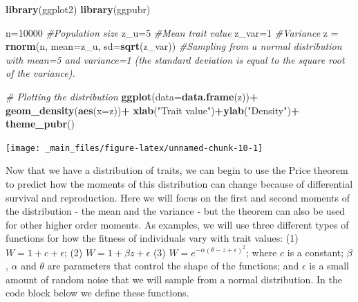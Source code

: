 \documentclass[
]{book}
\newenvironment{Shaded}{\begin{snugshade}}{\end{snugshade}}
\newcommand{\AttributeTok}[1]{\textcolor[rgb]{0.13,0.29,0.53}{#1}}
\newcommand{\CommentTok}[1]{\textcolor[rgb]{0.56,0.35,0.01}{\textit{#1}}}
\newcommand{\DecValTok}[1]{\textcolor[rgb]{0.00,0.00,0.81}{#1}}
\newcommand{\FunctionTok}[1]{\textcolor[rgb]{0.13,0.29,0.53}{\textbf{#1}}}
\newcommand{\NormalTok}[1]{#1}
\newcommand{\OtherTok}[1]{\textcolor[rgb]{0.56,0.35,0.01}{#1}}
\newcommand{\SpecialCharTok}[1]{\textcolor[rgb]{0.81,0.36,0.00}{\textbf{#1}}}
\newcommand{\StringTok}[1]{\textcolor[rgb]{0.31,0.60,0.02}{#1}}
\begin{document}
\begin{Shaded}
\begin{Highlighting}[]
\FunctionTok{library}\NormalTok{(ggplot2)}
\FunctionTok{library}\NormalTok{(ggpubr)}

\NormalTok{n}\OtherTok{=}\DecValTok{10000} \CommentTok{\#Population size}
\NormalTok{z\_u}\OtherTok{=}\DecValTok{5} \CommentTok{\#Mean trait value}
\NormalTok{z\_var}\OtherTok{=}\DecValTok{1} \CommentTok{\#Variance}
\NormalTok{z }\OtherTok{=} \FunctionTok{rnorm}\NormalTok{(n, }\AttributeTok{mean=}\NormalTok{z\_u, }\AttributeTok{sd=}\FunctionTok{sqrt}\NormalTok{(z\_var)) }\CommentTok{\#Sampling from a normal distribution with mean=5 and variance=1 (the standard deviation is equal to the square root of the variance).}

\CommentTok{\# Plotting the distribution}
\FunctionTok{ggplot}\NormalTok{(}\AttributeTok{data=}\FunctionTok{data.frame}\NormalTok{(z))}\SpecialCharTok{+}
  \FunctionTok{geom\_density}\NormalTok{(}\FunctionTok{aes}\NormalTok{(}\AttributeTok{x=}\NormalTok{z))}\SpecialCharTok{+}
  \FunctionTok{xlab}\NormalTok{(}\StringTok{"Trait value"}\NormalTok{)}\SpecialCharTok{+}\FunctionTok{ylab}\NormalTok{(}\StringTok{"Density"}\NormalTok{)}\SpecialCharTok{+}
  \FunctionTok{theme\_pubr}\NormalTok{()}
\end{Highlighting}
\end{Shaded}

\texttt{[image: \_main\_files/figure-latex/unnamed-chunk-10-1]}

Now that we have a distribution of traits, we can begin to use the Price theorem to predict how the moments of this distribution can change because of differential survival and reproduction. Here we will focus on the first and second moments of the distribution - the mean and the variance - but the theorem can also be used for other higher order moments. As examples, we will use three different types of functions for how the fitness of individuals vary with trait values: (1) \(W=1+c+\epsilon\); (2) \(W=1+\beta z +\epsilon\) (3) \(W=e^{-\alpha\left(\theta-z+\epsilon\right)^2}\); where \(c\) is a constant; \(\beta\), \(\alpha\) and \(\theta\) are parameters that control the shape of the functions; and \(\epsilon\) is a small amount of random noise that we will sample from a normal distribution. In the code block below we define these functions.
\end{document}
